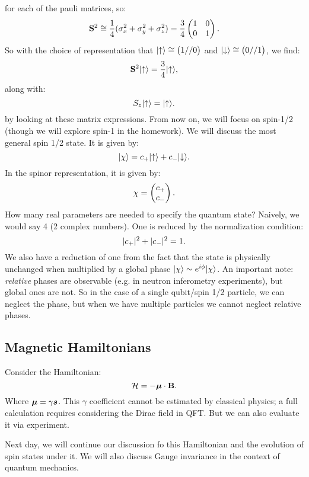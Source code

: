 for each of the pauli matrices, so:
\begin{equation}
    \mathbf{S}^2 \cong \frac{1}{4}(\sigma_x^2 + \sigma_y^2 + \sigma_z^2) = \frac{3}{4}\begin{pmatrix} 1 & 0 \\ 0 & 1 \end{pmatrix}.
\end{equation}
So with the choice of representation that $\lvert \uparrow \rangle \cong \begin{pmatrix}1//0\end{pmatrix}$ and $\lvert \downarrow \rangle \cong \begin{pmatrix}0//1\end{pmatrix}$, we find:
\begin{equation}
    \mathbf{S}^2\lvert \uparrow \rangle = \frac{3}{4}\lvert \uparrow \rangle,
\end{equation}
along with:
\begin{equation}
    S_z\lvert \uparrow \rangle = \lvert \uparrow \rangle.
\end{equation}
by looking at these matrix expressions. From now on, we will focus on spin-1/2 (though we will explore spin-1 in the homework). We will discuss the most general spin 1/2 state. It is given by:
\begin{equation}
    \lvert \chi \rangle = c_+\lvert \uparrow \rangle + c_-\lvert \downarrow \rangle.
\end{equation}
In the spinor representation, it is given by:
\begin{equation}
    \chi = \begin{pmatrix}c_+ \\ c_-\end{pmatrix}.
\end{equation}
How many real parameters are needed to specify the quantum state? Naively, we would say 4 (2 complex numbers). One is reduced by the normalization condition:
\begin{equation}
    \lvert c_+ \rvert^2 + \lvert c_- \rvert^2 = 1.
\end{equation}
We also have a reduction of one from the fact that the state is physically unchanged when multiplied by a global phase $\ket{\chi} \sim e^{i\phi}\ket{\chi}$. An important note: \emph{relative} phases are observable (e.g. in neutron inferometry experiments), but global ones are not. So in the case of a single qubit/spin 1/2 particle, we can neglect the phase, but when we have multiple particles we cannot neglect relative phases.

\subsection{Magnetic Hamiltonians}
Consider the Hamiltonian:
\begin{equation}
    \mathcal{H} = -\mbox{\boldmath$ \mu $} \cdot \mathbf{B}.
\end{equation}
Where $\mbox{\boldmath$ \mu $} = \gamma \mbox{\boldmath$ s $}$. This $\gamma$ coefficient cannot be estimated by classical physics; a full calculation requires considering the Dirac field in QFT. But we can also evaluate it via experiment.

Next day, we will continue our discussion fo this Hamiltonian and the evolution of spin states under it. We will also discuss Gauge invariance in the context of quantum mechanics.

